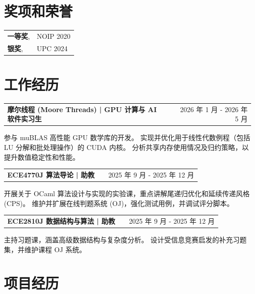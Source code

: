 \documentclass[a4paper,12pt]{article}
\makeatletter
\newenvironment{jobshort}[2]
    {
    \begin{tabularx}{\linewidth}{@{}l X r@{}}
    \textbf{#1} & \hfill &  #2 \\[3.75pt]
    \end{tabularx}
    }
    {
    }
\makeatother
\begin{document}

\section{奖项和荣誉}
\begin{tabularx}{\linewidth}{@{}l X@{}}
\textbf{一等奖}, & NOIP 2020 \\
\textbf{银奖}, & UPC 2024
\end{tabularx}



\section{工作经历}

\begin{jobshort}{摩尔线程 (Moore Threads) | GPU 计算与 AI 软件实习生}{2026 年 1 月 - 2026 年 5 月}
参与 muBLAS 高性能 GPU 数学库的开发。
实现并优化用于线性代数例程（包括 LU 分解和批处理操作）的 CUDA 内核。
分析共享内存使用情况及归约策略，以提升数值稳定性和性能。
\end{jobshort}

\begin{jobshort}{ECE4770J 算法导论 | 助教}{2025 年 9 月 - 2025 年 12 月}
开展关于 OCaml 算法设计与实现的实验课，重点讲解尾递归优化和延续传递风格 (CPS)。
维护并扩展在线判题系统 (OJ)，强化测试用例，并调试评分脚本。
\end{jobshort}

\begin{jobshort}{ECE2810J 数据结构与算法 | 助教}{2025 年 9 月 - 2025 年 12 月}
主持习题课，涵盖高级数据结构与复杂度分析。
设计受信息竞赛启发的补充习题集，并维护课程 OJ 系统。
\end{jobshort}


\section{项目经历}
\end{document}
